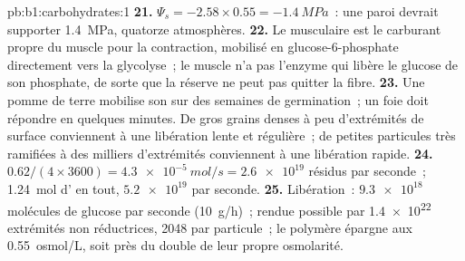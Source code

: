 \begin{solution}{pb:b1:carbohydrates:1}
\textbf{21.} $\Psi_s = -2.58\times 0.55 = \qty{-1.4}{MPa}$~: une paroi
devrait supporter \qty{1.4}{MPa}, quatorze atmosphères.
\textbf{22.} Le  musculaire est le carburant propre du muscle
pour la contraction, mobilisé en glucose-6-phosphate directement vers
la glycolyse~; le muscle n'a pas l'enzyme qui libère le glucose de son
phosphate, de sorte que la réserve ne peut pas quitter la fibre.
\textbf{23.} Une pomme de terre mobilise son  sur des semaines de
germination~; un foie doit répondre en quelques minutes. De gros grains
denses à peu d'extrémités de surface conviennent à une libération lente
et régulière~; de petites particules très ramifiées à des milliers
d'extrémités conviennent à une libération rapide.
\textbf{24.} $0.62/(4\times 3600) = \qty{4.3e-5}{mol/s} = \num{2.6e19}$
résidus par seconde~; \qty{1.24}{mol} d' en tout, $\num{5.2e19}$ par
seconde.
\textbf{25.} Libération~: $\num{9.3e18}$ molécules de glucose par
seconde (\qty{10}{g/h})~; rendue possible par \num{1.4e22} extrémités
non réductrices, \num{2048} par particule~; le polymère épargne aux
 \qty{0.55}{osmol/L}, soit près du double de leur propre
osmolarité.
\end{solution}
